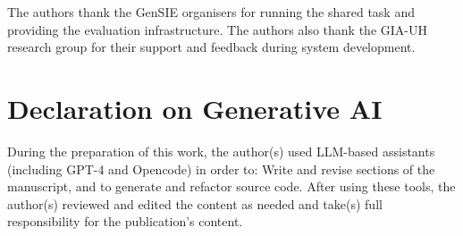 \documentclass{ceurart}
\begin{document}
\begin{acknowledgments}
The authors thank the GenSIE organisers for running the shared task and providing the
evaluation infrastructure.
The authors also thank the GIA-UH research group for their support and feedback during
system development.
\end{acknowledgments}

\section*{Declaration on Generative AI}
  During the preparation of this work, the author(s) used LLM-based assistants (including
  GPT-4 and Opencode) in order to: Write and revise sections of the manuscript, and to
  generate and refactor source code. After using these tools, the author(s) reviewed and
  edited the content as needed and take(s) full responsibility for the publication's
  content.


\end{document}
